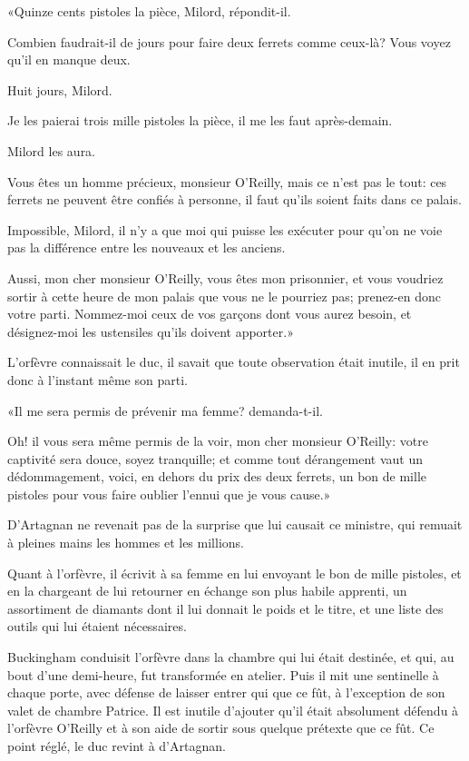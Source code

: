 «Quinze cents pistoles la pièce, Milord, répondit-il. 

\speak  Combien faudrait-il de jours pour faire deux ferrets comme ceux-là? Vous voyez qu'il en manque deux. 

\speak  Huit jours, Milord. 

\speak  Je les paierai trois mille pistoles la pièce, il me les faut après-demain. 

\speak  Milord les aura. 

\speak  Vous êtes un homme précieux, monsieur O'Reilly, mais ce n'est pas le tout: ces ferrets ne peuvent être confiés à personne, il faut qu'ils soient faits dans ce palais. 

\speak  Impossible, Milord, il n'y a que moi qui puisse les exécuter pour qu'on ne voie pas la différence entre les nouveaux et les anciens. 

\speak  Aussi, mon cher monsieur O'Reilly, vous êtes mon prisonnier, et vous voudriez sortir à cette heure de mon palais que vous ne le pourriez pas; prenez-en donc votre parti. Nommez-moi ceux de vos garçons dont vous aurez besoin, et désignez-moi les ustensiles qu'ils doivent apporter.» 

L'orfèvre connaissait le duc, il savait que toute observation était inutile, il en prit donc à l'instant même son parti. 

«Il me sera permis de prévenir ma femme? demanda-t-il. 

\speak  Oh! il vous sera même permis de la voir, mon cher monsieur O'Reilly: votre captivité sera douce, soyez tranquille; et comme tout dérangement vaut un dédommagement, voici, en dehors du prix des deux ferrets, un bon de mille pistoles pour vous faire oublier l'ennui que je vous cause.» 

D'Artagnan ne revenait pas de la surprise que lui causait ce ministre, qui remuait à pleines mains les hommes et les millions. 

Quant à l'orfèvre, il écrivit à sa femme en lui envoyant le bon de mille pistoles, et en la chargeant de lui retourner en échange son plus habile apprenti, un assortiment de diamants dont il lui donnait le poids et le titre, et une liste des outils qui lui étaient nécessaires. 

Buckingham conduisit l'orfèvre dans la chambre qui lui était destinée, et qui, au bout d'une demi-heure, fut transformée en atelier. Puis il mit une sentinelle à chaque porte, avec défense de laisser entrer qui que ce fût, à l'exception de son valet de chambre Patrice. Il est inutile d'ajouter qu'il était absolument défendu à l'orfèvre O'Reilly et à son aide de sortir sous quelque prétexte que ce fût. Ce point réglé, le duc revint à d'Artagnan. 

